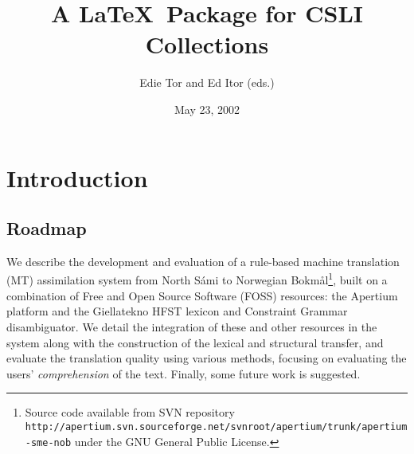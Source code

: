 \documentclass{book}
\title{A \LaTeX\ Package for CSLI Collections}    %
\author{Edie Tor and Ed Itor (eds.)}              %
\date{May 23, 2002}                               %
\begin{document}
\frontmatter      %

\maketitle

\setcounter{page}{5}
\setcounter{tocdepth}{0}  %


\mainmatter


% 


\newcommand{\href}[2]{{\tt #1}} %
\newcommand{\sme}{{\tt sme}}
\newcommand{\nob}{{\tt nob}}
\newcommand{\smenob}{\sme$\rightarrow{}$\nob}
\newcommand{\nobsme}{\nob$\rightarrow{}$\sme}



\section{Introduction} %
\subsection{Roadmap}  
We describe the development and evaluation of a rule-based machine
translation (MT) assimilation system from North S\'{a}mi to Norwegian
Bokm{\aa}l\footnote{Source code available from SVN repository\\
  \href{http://apertium.svn.sourceforge.net/svnroot/apertium/trunk/apertium-sme-nob}{http://apertium.svn.sourceforge.net/svnroot/apertium/trunk/apertium-sme-nob}
  under the GNU General Public License.}, built on a combination of
Free and Open Source Software (FOSS) resources: the Apertium platform
and the Giellatekno HFST lexicon and Constraint Grammar disambiguator.
We detail the integration of these and other resources in the system
along with the construction of the lexical and structural transfer,
and evaluate the translation quality using various methods, focusing
on evaluating the users' \textit{comprehension} of the text. Finally,
some future work is suggested.
\end{document}
